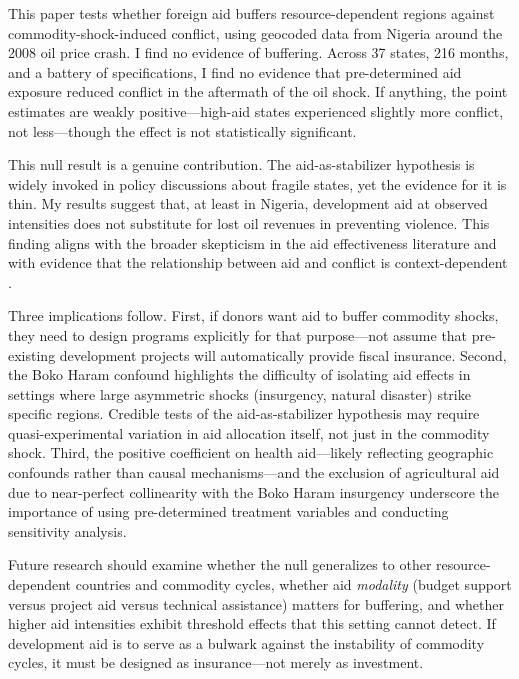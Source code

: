 \documentclass[12pt]{article}
\begin{document}
This paper tests whether foreign aid buffers resource-dependent regions against commodity-shock-induced conflict, using geocoded data from Nigeria around the 2008 oil price crash. I find no evidence of buffering. Across 37 states, 216 months, and a battery of specifications, I find no evidence that pre-determined aid exposure reduced conflict in the aftermath of the oil shock. If anything, the point estimates are weakly positive---high-aid states experienced slightly more conflict, not less---though the effect is not statistically significant.

This null result is a genuine contribution. The aid-as-stabilizer hypothesis is widely invoked in policy discussions about fragile states, yet the evidence for it is thin. My results suggest that, at least in Nigeria, development aid at observed intensities does not substitute for lost oil revenues in preventing violence. This finding aligns with the broader skepticism in the aid effectiveness literature \citep{nunn2014us, crost2014aid} and with evidence that the relationship between aid and conflict is context-dependent \citep{finding2015aid, blair2023foreign}.

Three implications follow. First, if donors want aid to buffer commodity shocks, they need to design programs explicitly for that purpose---not assume that pre-existing development projects will automatically provide fiscal insurance. Second, the Boko Haram confound highlights the difficulty of isolating aid effects in settings where large asymmetric shocks (insurgency, natural disaster) strike specific regions. Credible tests of the aid-as-stabilizer hypothesis may require quasi-experimental variation in aid allocation itself, not just in the commodity shock. Third, the positive coefficient on health aid---likely reflecting geographic confounds rather than causal mechanisms---and the exclusion of agricultural aid due to near-perfect collinearity with the Boko Haram insurgency underscore the importance of using pre-determined treatment variables and conducting sensitivity analysis.

Future research should examine whether the null generalizes to other resource-dependent countries and commodity cycles, whether aid \emph{modality} (budget support versus project aid versus technical assistance) matters for buffering, and whether higher aid intensities exhibit threshold effects that this setting cannot detect. If development aid is to serve as a bulwark against the instability of commodity cycles, it must be designed as insurance---not merely as investment.
\end{document}
